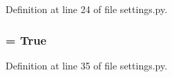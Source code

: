 Definition at line 24 of file settings.py.\hypertarget{namespaceEarls__Admin_1_1settings_81596e34e2b70709757aa85c6d98570b}{
\subsubsection[USE\_\-I18N]{ = True}}
\label{namespaceEarls__Admin_1_1settings_81596e34e2b70709757aa85c6d98570b}




Definition at line 35 of file settings.py.